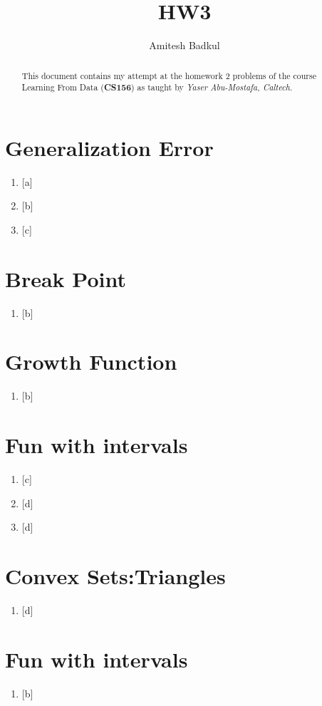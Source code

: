 \documentclass[]{article}
\begin{document}
\title{HW3}
\author{Amitesh Badkul}
\maketitle

\begin{abstract}
This document contains my attempt at the homework 2 problems of the course
Learning From Data ({\bf CS156}) as taught by {\em Yaser Abu-Mostafa, Caltech}.
\end{abstract}


\section{Generalization Error}
\begin{enumerate}
\item {[a]}
\item {[b]}
\item {[c]}
\end{enumerate}


\section{Break Point}
\begin{enumerate}
\item {[b]}
\end{enumerate}

\section{Growth Function}
\begin{enumerate}
\item {[b]}
\end{enumerate}

\section{Fun with intervals}
\begin{enumerate}
\item {[c]}
\item {[d]}
\item {[d]}
\end{enumerate}


\section{Convex Sets:Triangles}
\begin{enumerate}
\item {[d]}
\end{enumerate}


\section{Fun with intervals}
\begin{enumerate}
\item {[b]}
\end{enumerate}
\end{document}
